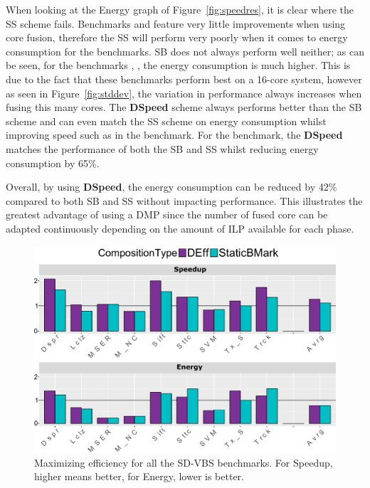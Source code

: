 When looking at the Energy graph of Figure~\ref{fig:speedres}, it is clear where the SS scheme fails.
Benchmarks  and  feature very little improvements when using core fusion, therefore the SS will perform very poorly when it comes to energy consumption for the benchmarks.
SB does not always perform well neither; as can be seen, for the benchmarks , ,  the energy consumption is much higher.
This is due to the fact that these benchmarks perform best on a 16-core system, however as seen in Figure~\ref{fig:stddev}, the variation in performance always increases when fusing this many cores.
The \textbf{DSpeed} scheme always performs better than the SB scheme and can even match the SS scheme on energy consumption whilst improving speed such as in the  benchmark.
For the  benchmark, the \textbf{DSpeed} matches the performance of both the SB and SS whilst reducing energy consumption by 65\%.

Overall, by using \textbf{DSpeed}, the energy consumption can be reduced by 42\% compared to both SB and SS without impacting performance.
This illustrates the greatest advantage of using a DMP since the number of fused core can be adapted continuously depending on the amount of ILP available for each phase.


\begin{figure}
    \centering
    \includegraphics[width=1\textwidth]{cases-paper/graphics/results/edd_bars2.pdf}
    \caption{Maximizing efficiency for all the SD-VBS benchmarks. For Speedup, higher means better, for Energy, lower is better.}
    \label{fig:effres}
	\vspace{1em}
\end{figure}
